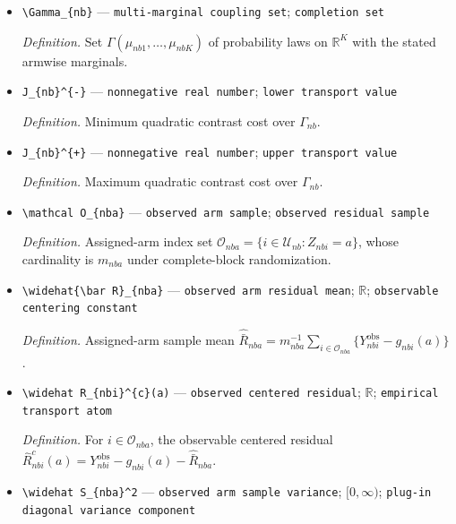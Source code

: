 \documentclass{article}
\begin{document}
\begin{itemize}
  \item \texttt{\textbackslash{}\allowbreak{}Gamma\_\allowbreak{}\{nb\}\allowbreak{}} --- \texttt{multi-\allowbreak{}marginal coupling set}; \texttt{completion set}
  \par\smallskip\noindent\emph{Definition.} Set \(\Gamma(\mu_{nb1},\ldots,\mu_{nbK})\) of probability laws on \(\mathbb R^K\) with the stated armwise marginals.
  \item \texttt{J\_\allowbreak{}\{nb\}\allowbreak{}\textasciicircum{}\{-\allowbreak{}\}\allowbreak{}} --- \texttt{nonnegative real number}; \texttt{lower transport value}
  \par\smallskip\noindent\emph{Definition.} Minimum quadratic contrast cost over \(\Gamma_{nb}\).
  \item \texttt{J\_\allowbreak{}\{nb\}\allowbreak{}\textasciicircum{}\{+\allowbreak{}\}\allowbreak{}} --- \texttt{nonnegative real number}; \texttt{upper transport value}
  \par\smallskip\noindent\emph{Definition.} Maximum quadratic contrast cost over \(\Gamma_{nb}\).
  \item \texttt{\textbackslash{}\allowbreak{}mathcal O\_\allowbreak{}\{nba\}\allowbreak{}} --- \texttt{observed arm sample}; \texttt{observed residual sample}
  \par\smallskip\noindent\emph{Definition.} Assigned-arm index set \(\mathcal O_{nba}=\{i\in\mathcal U_{nb}:Z_{nbi}=a\}\), whose cardinality is \(m_{nba}\) under complete-block randomization.
  \item \texttt{\textbackslash{}\allowbreak{}widehat\{\textbackslash{}\allowbreak{}bar R\}\allowbreak{}\_\allowbreak{}\{nba\}\allowbreak{}} --- \texttt{observed arm residual mean}; \(\mathbb R\); \texttt{observable centering constant}
  \par\smallskip\noindent\emph{Definition.} Assigned-arm sample mean \(\widehat{\bar R}_{nba}=m_{nba}^{-1}\sum_{i\in\mathcal O_{nba}}\{Y_{nbi}^{\mathrm{obs}}-g_{nbi}(a)\}\).
  \item \texttt{\textbackslash{}\allowbreak{}widehat R\_\allowbreak{}\{nbi\}\allowbreak{}\textasciicircum{}\{c\}\allowbreak{}(a)} --- \texttt{observed centered residual}; \(\mathbb R\); \texttt{empirical transport atom}
  \par\smallskip\noindent\emph{Definition.} For \(i\in\mathcal O_{nba}\), the observable centered residual \(\widehat R_{nbi}^{c}(a)=Y_{nbi}^{\mathrm{obs}}-g_{nbi}(a)-\widehat{\bar R}_{nba}\).
  \item \texttt{\textbackslash{}\allowbreak{}widehat S\_\allowbreak{}\{nba\}\allowbreak{}\textasciicircum{}2} --- \texttt{observed arm sample variance}; \([0,\infty)\); \texttt{plug-\allowbreak{}in diagonal variance component}

\end{itemize}
\end{document}

